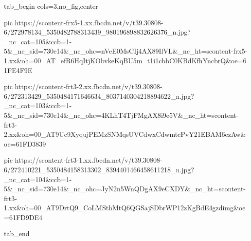  
 
 
 
 


\ifcmt
  tab_begin cols=3,no_fig,center

     pic https://scontent-frx5-1.xx.fbcdn.net/v/t39.30808-6/272978134_5350482788313439_980196898832626376_n.jpg?_nc_cat=105&ccb=1-5&_nc_sid=730e14&_nc_ohc=nVeE0MsCIj4AX89IlVL&_nc_ht=scontent-frx5-1.xx&oh=00_AT_efR6HqItjKObvkeKqBU5m_t1i1cbbC0KBdKfhYncbrQ&oe=61FE4F9E

     pic https://scontent-frt3-2.xx.fbcdn.net/v/t39.30808-6/272313429_5350484171646634_8037140304218894622_n.jpg?_nc_cat=103&ccb=1-5&_nc_sid=730e14&_nc_ohc=4KLhT4TjFMgAX8i9e5V&_nc_ht=scontent-frt3-2.xx&oh=00_AT9Uc9XyqujPEMzSNMqsUVCdwxCdwmtcPvY21EBAM6ezAw&oe=61FD3839

     pic https://scontent-frt3-1.xx.fbcdn.net/v/t39.30808-6/272410221_5350484158313302_8394401466458611218_n.jpg?_nc_cat=104&ccb=1-5&_nc_sid=730e14&_nc_ohc=JyN2n5WnQDgAX9eCXDY&_nc_ht=scontent-frt3-1.xx&oh=00_AT9DrtQ9_CoLMSthMtQ6QGSajSDbrWP12zKgBdE4gzdimg&oe=61FD9DE4

  tab_end
\fi
